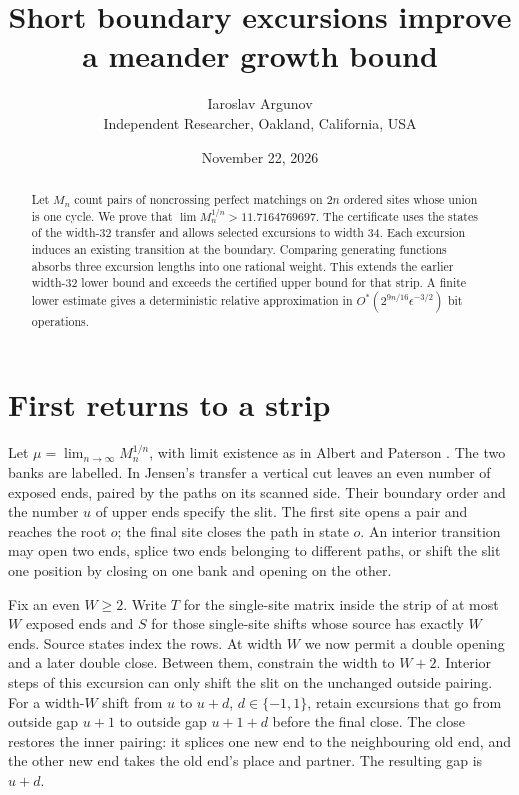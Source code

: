 \documentclass[11pt]{article}
\title{\bfseries Short boundary excursions improve a meander growth bound}
\author{Iaroslav Argunov\\{\small Independent Researcher, Oakland, California, USA}}
\date{November 22, 2026}
\begin{document}
\maketitle
\begin{abstract}
Let \(M_n\) count pairs of noncrossing perfect matchings on \(2n\) ordered sites whose union is one cycle. We prove that \(\lim M_n^{1/n}>11.7164769697\). The certificate uses the states of the width-32 transfer and allows selected excursions to width 34. Each excursion induces an existing transition at the boundary. Comparing generating functions absorbs three excursion lengths into one rational weight. This extends the earlier width-32 lower bound and exceeds the certified upper bound for that strip. A finite lower estimate gives a deterministic relative approximation in \(O^*(2^{9n/16}\epsilon^{-3/2})\) bit operations.
\end{abstract}

\section{First returns to a strip}
Let \(\mu=\lim_{n\to\infty}M_n^{1/n}\), with limit existence as in Albert and Paterson \cite{ap}. The two banks are labelled. In Jensen's transfer \cite{jensen} a vertical cut leaves an even number of exposed ends, paired by the paths on its scanned side. Their boundary order and the number \(u\) of upper ends specify the slit. The first site opens a pair and reaches the root \(o\); the final site closes the path in state \(o\). An interior transition may open two ends, splice two ends belonging to different paths, or shift the slit one position by closing on one bank and opening on the other.

Fix an even \(W\ge2\). Write \(T\) for the single-site matrix inside the strip of at most \(W\) exposed ends and \(S\) for those single-site shifts whose source has exactly \(W\) ends. Source states index the rows. At width \(W\) we now permit a double opening and a later double close. Between them, constrain the width to \(W+2\). Interior steps of this excursion can only shift the slit on the unchanged outside pairing. For a width-\(W\) shift from \(u\) to \(u+d\), \(d\in\{-1,1\}\), retain excursions that go from outside gap \(u+1\) to outside gap \(u+1+d\) before the final close. The close restores the inner pairing: it splices one new end to the neighbouring old end, and the other new end takes the old end's place and partner. The resulting gap is \(u+d\).
\end{document}
